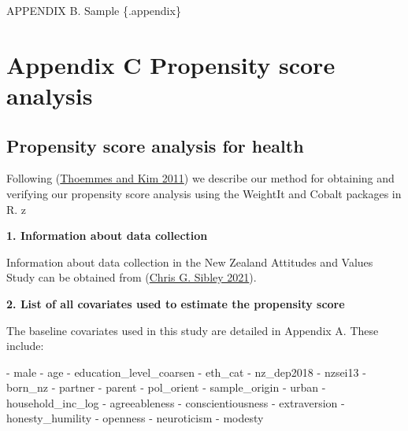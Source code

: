 \documentclass[
  singlecolumn]{report}
\newenvironment{Shaded}{\begin{snugshade}}{\end{snugshade}}
\newcommand{\NormalTok}[1]{\textcolor[rgb]{0.00,0.23,0.31}{#1}}
\newcommand{\SpecialStringTok}[1]{\textcolor[rgb]{0.13,0.47,0.30}{#1}}
\begin{document}
\newpage{}

APPENDIX B. Sample \{.appendix\}

\newpage{}

\hypertarget{appendix-c-propensity-score-analysis}{%
\section{Appendix C Propensity score
analysis}\label{appendix-c-propensity-score-analysis}}

\hypertarget{propensity-score-analysis-for-health}{%
\subsection{Propensity score analysis for
health}\label{propensity-score-analysis-for-health}}

Following (\protect\hyperlink{ref-thoemmes2011}{Thoemmes and Kim 2011})
we describe our method for obtaining and verifying our propensity score
analysis using the WeightIt and Cobalt packages in R. z

\textbf{1. Information about data collection}

Information about data collection in the New Zealand Attitudes and
Values Study can be obtained from
(\protect\hyperlink{ref-sibley2021}{Chris G. Sibley 2021}).

\textbf{2. List of all covariates used to estimate the propensity score}

The baseline covariates used in this study are detailed in Appendix A.
These include:

\begin{Shaded}
\begin{Highlighting}[]
\SpecialStringTok{{-} }\NormalTok{male}
\SpecialStringTok{{-} }\NormalTok{age}
\SpecialStringTok{{-} }\NormalTok{education\_level\_coarsen}
\SpecialStringTok{{-} }\NormalTok{eth\_cat}
\SpecialStringTok{{-} }\NormalTok{nz\_dep2018}
\SpecialStringTok{{-} }\NormalTok{nzsei13}
\SpecialStringTok{{-} }\NormalTok{born\_nz}
\SpecialStringTok{{-} }\NormalTok{partner}
\SpecialStringTok{{-} }\NormalTok{parent}
\SpecialStringTok{{-} }\NormalTok{pol\_orient}
\SpecialStringTok{{-} }\NormalTok{sample\_origin}
\SpecialStringTok{{-} }\NormalTok{urban}
\SpecialStringTok{{-} }\NormalTok{household\_inc\_log}
\SpecialStringTok{{-} }\NormalTok{agreeableness}
\SpecialStringTok{{-} }\NormalTok{conscientiousness}
\SpecialStringTok{{-} }\NormalTok{extraversion}
\SpecialStringTok{{-} }\NormalTok{honesty\_humility}
\SpecialStringTok{{-} }\NormalTok{openness}
\SpecialStringTok{{-} }\NormalTok{neuroticism}
\SpecialStringTok{{-} }\NormalTok{modesty}
\end{Highlighting}
\end{Shaded}
\end{document}
